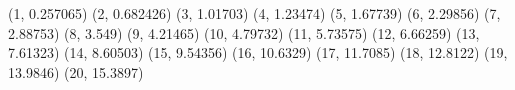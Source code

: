 (1, 0.257065) (2, 0.682426) (3, 1.01703) (4, 1.23474) (5, 1.67739) (6, 2.29856) (7, 2.88753) (8, 3.549) (9, 4.21465) (10, 4.79732) (11, 5.73575) (12, 6.66259) (13, 7.61323) (14, 8.60503) (15, 9.54356) (16, 10.6329) (17, 11.7085) (18, 12.8122) (19, 13.9846) (20, 15.3897) 